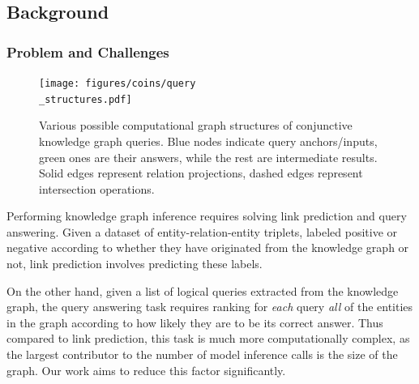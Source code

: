  

\vspace{-3mm}
\subsection{Background}
\label{sec:background}
\subsubsection{Problem and Challenges}

\begin{figure}[t!]
    \centering
    \texttt{[image: figures/coins/query\\\_structures.pdf]}
    \caption[Various possible computational graph structures of conjunctive knowledge graph queries.]{Various possible computational graph structures of conjunctive knowledge graph queries. Blue nodes indicate query anchors/inputs, green ones are their answers, while the rest are intermediate results. Solid edges represent relation projections, dashed edges represent intersection operations.}
    \label{fig:query_structures}
\end{figure}

Performing knowledge graph inference requires solving link prediction and query answering. Given a dataset of entity-relation-entity triplets, labeled positive or negative according to whether they have originated from the knowledge graph or not, link prediction involves predicting these labels. 

On the other hand, given a list of logical queries extracted from the knowledge graph, the query answering task requires ranking for \emph{each} query \emph{all} of the entities in the graph according to how likely they are to be its correct answer. Thus compared to link prediction, this task is much more computationally complex, as the largest contributor to the number of model inference calls is the size of the graph. Our work aims to reduce this factor significantly.

